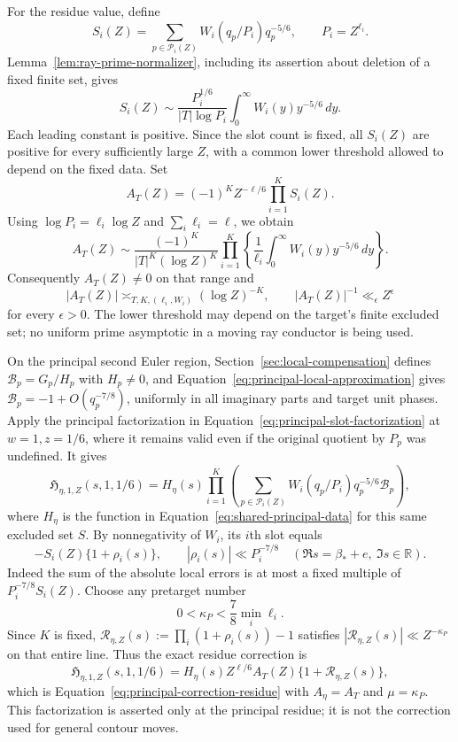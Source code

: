 \documentclass[11pt,a4paper]{article}
\numberwithin{equation}{section}
\numberwithin{figure}{section}
\theoremstyle{definition}
\theoremstyle{remark}
\begin{document}
For the residue value, define
\[
 S_i(Z)=\sum_{p\in\mathcal P_i(Z)}W_i(q_p/P_i)q_p^{-5/6},
 \qquad P_i=Z^{\ell_i}.
\]
Lemma~\ref{lem:ray-prime-normalizer}, including its assertion about deletion
of a fixed finite set, gives
\[
 S_i(Z)\sim\frac{P_i^{1/6}}{|T|\log P_i}
       \int_0^\infty W_i(y)y^{-5/6}\,dy.
\]
Each leading constant is positive.  Since the slot count is fixed,
all \(S_i(Z)\) are positive for every sufficiently large \(Z\), with
a common lower threshold allowed to depend on the fixed data.  Set
\begin{equation}\label{eq:principal-scalar}
 A_T(Z)=(-1)^K Z^{-\ell/6}\prod_{i=1}^K S_i(Z).
\end{equation}
Using \(\log P_i=\ell_i\log Z\) and \(\sum_i\ell_i=\ell\), we obtain
\[
 A_T(Z)\sim
 \frac{(-1)^K}{|T|^K(\log Z)^K}
 \prod_{i=1}^K\left\{\frac1{\ell_i}
       \int_0^\infty W_i(y)y^{-5/6}\,dy\right\}.
\]
Consequently \(A_T(Z)\ne0\) on that range and
\[
 |A_T(Z)|\asymp_{T,K,(\ell_i,W_i)}(\log Z)^{-K},
 \qquad |A_T(Z)|^{-1}\ll_\epsilon Z^\epsilon
\]
for every \(\epsilon>0\).  The lower threshold may depend on the target's
finite excluded set; no uniform prime asymptotic in a moving ray conductor
is being used.

On the principal second Euler region, Section~\ref{sec:local-compensation}
defines \(\mathcal B_p=G_p/H_p\) with \(H_p\ne0\), and
Equation~\eqref{eq:principal-local-approximation} gives
\(\mathcal B_p=-1+O(q_p^{-7/8})\), uniformly in all imaginary parts and
target unit phases.  Apply the principal factorization in
Equation~\eqref{eq:principal-slot-factorization} at \(w=1,z=1/6\), where
it remains valid even if the original quotient by \(P_p\) was undefined.
It gives
\[
 \mathfrak H_{\eta,1,Z}(s,1,1/6)
 =H_\eta(s)\prod_{i=1}^K
       \left(\sum_{p\in\mathcal P_i(Z)}
           W_i(q_p/P_i)q_p^{-5/6}\mathcal B_p\right),
\]
where \(H_\eta\) is the function in Equation~\eqref{eq:shared-principal-data}
for this same excluded set \(S\).  By nonnegativity of \(W_i\), its \(i\)th
slot equals
\[
 -S_i(Z)\{1+\rho_i(s)\},\qquad
 |\rho_i(s)|\ll P_i^{-7/8}
 \quad(\Re s=\beta_*+e,\ \Im s\in\mathbb R).
\]
Indeed the sum of the absolute local errors is at most a fixed multiple of
\(P_i^{-7/8}S_i(Z)\).  Choose any pretarget number
\[
 0<\kappa_P<\frac78\min_i\ell_i.
\]
Since \(K\) is fixed, \(\mathcal R_{\eta,Z}(s):=\prod_i(1+\rho_i(s))-1\)
satisfies \(|\mathcal R_{\eta,Z}(s)|\ll Z^{-\kappa_P}\) on that entire line.
Thus the exact residue correction is
\[
 \mathfrak H_{\eta,1,Z}(s,1,1/6)
 =H_\eta(s)Z^{\ell/6}A_T(Z)\{1+\mathcal R_{\eta,Z}(s)\},
\]
which is Equation~\eqref{eq:principal-correction-residue} with
\(A_\eta=A_T\) and \(\mu=\kappa_P\).  This factorization is asserted
only at the principal residue; it is not the correction used for general
contour moves.
\end{document}
